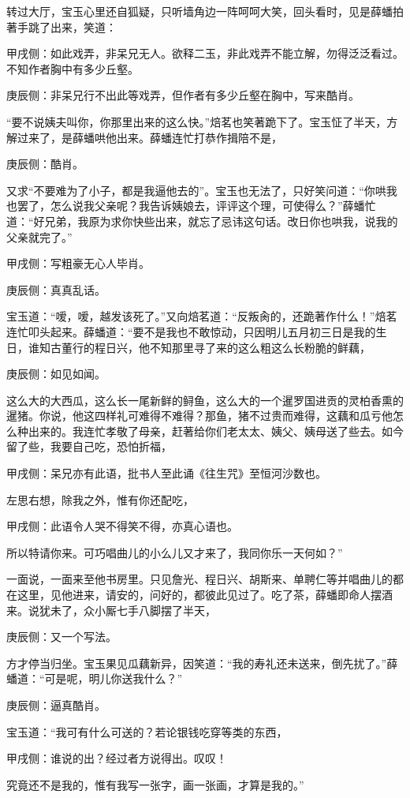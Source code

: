 \begin{parag}
    转过大厅，宝玉心里还自狐疑，只听墙角边一阵呵呵大笑，回头看时，见是薛蟠拍著手跳了出来，笑道：\begin{note}甲戌侧：如此戏弄，非呆兄无人。欲释二玉，非此戏弄不能立解，勿得泛泛看过。不知作者胸中有多少丘壑。\end{note}\begin{note}庚辰侧：非呆兄行不出此等戏弄，但作者有多少丘壑在胸中，写来酷肖。\end{note}“要不说姨夫叫你，你那里出来的这么快。”焙茗也笑著跪下了。宝玉怔了半天，方解过来了，是薛蟠哄他出来。薛蟠连忙打恭作揖陪不是，\begin{note}庚辰侧：酷肖。\end{note}又求“不要难为了小子，都是我逼他去的”。宝玉也无法了，只好笑问道：“你哄我也罢了，怎么说我父亲呢？我告诉姨娘去，评评这个理，可使得么？”薛蟠忙道：“好兄弟，我原为求你快些出来，就忘了忌讳这句话。改日你也哄我，说我的父亲就完了。”\begin{note}甲戌侧：写粗豪无心人毕肖。\end{note}\begin{note}庚辰侧：真真乱话。\end{note}宝玉道：“嗳，嗳，越发该死了。”又向焙茗道：“反叛肏的，还跪著作什么！”焙茗连忙叩头起来。薛蟠道：“要不是我也不敢惊动，只因明儿五月初三日是我的生日，谁知古董行的程日兴，他不知那里寻了来的这么粗这么长粉脆的鲜藕，\begin{note}庚辰侧：如见如闻。\end{note}这么大的大西瓜，这么长一尾新鲜的鲟鱼，这么大的一个暹罗国进贡的灵柏香熏的暹猪。你说，他这四样礼可难得不难得？那鱼，猪不过贵而难得，这藕和瓜亏他怎么种出来的。我连忙孝敬了母亲，赶著给你们老太太、姨父、姨母送了些去。如今留了些，我要自己吃，恐怕折福，\begin{note}甲戌侧：呆兄亦有此语，批书人至此诵《往生咒》至恒河沙数也。\end{note}左思右想，除我之外，惟有你还配吃，\begin{note}甲戌侧：此语令人哭不得笑不得，亦真心语也。\end{note}所以特请你来。可巧唱曲儿的小么儿又才来了，我同你乐一天何如？”
\end{parag}


\begin{parag}
    一面说，一面来至他书房里。只见詹光、程日兴、胡斯来、单聘仁等并唱曲儿的都在这里，见他进来，请安的，问好的，都彼此见过了。吃了茶，薛蟠即命人摆酒来。说犹未了，众小厮七手八脚摆了半天，\begin{note}庚辰侧：又一个写法。\end{note}方才停当归坐。宝玉果见瓜藕新异，因笑道：“我的寿礼还未送来，倒先扰了。”薛蟠道：“可是呢，明儿你送我什么？”\begin{note}庚辰侧：逼真酷肖。\end{note}宝玉道：“我可有什么可送的？若论银钱吃穿等类的东西，\begin{note}甲戌侧：谁说的出？经过者方说得出。叹叹！\end{note}究竟还不是我的，惟有我写一张字，画一张画，才算是我的。”
\end{parag}


